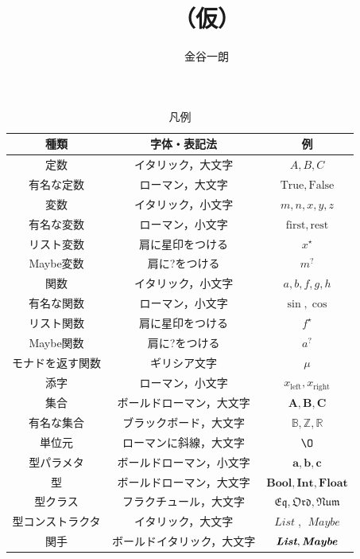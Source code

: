 \documentclass[a4paper]{jsbook}
\title{\haskell （仮）}
\author{金谷一朗}
\newcommand{\mSpecialConst}[1]{\mathrm{#1}} %
\newcommand{\mTrue}{\mSpecialConst{True}}
\newcommand{\mFalse}{\mSpecialConst{False}}
\newcommand{\mZero}{\O}
\newcommand{\mSpecialVar}[1]{\mathrm{#1}} %
\newcommand{\mFirstVar}{\mSpecialVar{first}}
\newcommand{\mRestVar}{\mSpecialVar{rest}}
\newcommand{\mSpecialSub}[1]{\text{#1}}
\newcommand{\mLeft}{\mSpecialSub{left}}
\newcommand{\mRight}{\mSpecialSub{right}}
\newcommand{\mSet}[1]{\mathbf{#1}}
\newcommand{\mSpecialSet}[1]{\mathbb{#1}} %
\newcommand{\mRSet}{\mSpecialSet{R}}
\newcommand{\mZSet}{\mSpecialSet{Z}}
\newcommand{\mBSet}{\mSpecialSet{B}}
\newcommand{\mTypeParameter}[1]{\mathbf{#1}}
\newcommand{\mType}[1]{\mathbf{#1}}
\newcommand{\mBoolType}{\mType{Bool}}
\newcommand{\mIntType}{\mType{Int}}
\newcommand{\mFloatType}{\mType{Float}}
\newcommand{\mFunctor}[1]{\textit{\textbf{#1}}}
\newcommand{\mTypeConstructor}[1]{\mathit{#1}} %
\newcommand{\mSpecialTypeClass}[1]{\mathfrak{#1}} %
\newcommand{\mEqTypeClass}{\mSpecialTypeClass{Eq}}
\newcommand{\mOrdTypeClass}{\mSpecialTypeClass{Ord}}
\newcommand{\mNumTypeClass}{\mSpecialTypeClass{Num}}
\newcommand{\mList}[1]{{#1}^\mathrm{\star}}
\newcommand{\mMaybe}[1]{{#1}^\text{?}}
\newcommand{\mMonadFunc}[1]{#1}%
\DeclareMathOperator{\mListTypeConstructor}{\mTypeConstructor{List}}
\DeclareMathOperator{\mMaybeTypeConstructor}{\mTypeConstructor{Maybe}}
\newcommand{\mathVarKeyword}[1]{\operatorname{\mathrm{#1}}}
\newcommand{\mFirstVar}{\mathVarKeyword{first}}
\begin{document}
\setlength{\baselineskip}{17pt}
\maketitle
\tableofcontents

\begin{table}
\caption{凡例}
\begin{center}
\begin{tabular}{||c|c|c||}
\hline
種類&字体・表記法&例\\
\hline\hline
定数&イタリック，大文字&$A,B,C$\\
有名な定数&ローマン，大文字&$\mTrue,\mFalse$\\
\hline
変数&イタリック，小文字&$m,n,x,y,z$\\
有名な変数&ローマン，小文字&$\mFirstVar,\mRestVar$\\
リスト変数&肩に星印をつける&$\mList{x}$\\
Maybe変数&肩に?をつける&$\mMaybe{m}$\\
\hline
関数&イタリック，小文字&$a,b,f,g,h$\\
有名な関数&ローマン，小文字&$\sin,\cos$\\
リスト関数&肩に星印をつける&$\mList{f}$\\
Maybe関数&肩に?をつける&$\mMaybe{a}$\\
モナドを返す関数&ギリシア文字&$\mMonadFunc{\mu}$\\
\hline
添字&ローマン，小文字&$x_\mLeft,x_\mRight$\\
\hline
集合&ボールドローマン，大文字&$\mSet{A},\mSet{B},\mSet{C}$\\
有名な集合&ブラックボード，大文字&$\mBSet,\mZSet,\mRSet$\\
単位元&ローマンに斜線，大文字&$\mZero$\\
\hline
型パラメタ&ボールドローマン，小文字&$\mTypeParameter{a},\mTypeParameter{b},\mTypeParameter{c}$\\
型&ボールドローマン，大文字&$\mBoolType,\mIntType,\mFloatType$\\
型クラス&フラクチュール，大文字&$\mEqTypeClass,\mOrdTypeClass,\mNumTypeClass$\\
\hline
型コンストラクタ&イタリック，大文字&$\mListTypeConstructor$, $\mMaybeTypeConstructor$\\
関手&ボールドイタリック，大文字&$\mFunctor{List},\mFunctor{Maybe}$\\

\end{tabular}
\end{center}
\end{table}
\end{document}
